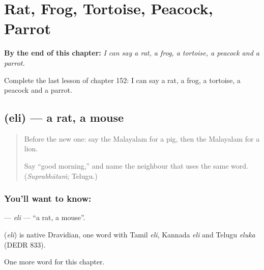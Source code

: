 
\chapter{Rat, Frog, Tortoise, Peacock, Parrot}
\label{ch:ml-rat-frog-tortoise-peacock-parrot}

\begin{chapteropening}
\textbf{By the end of this chapter:} \emph{I can say a rat, a frog, a tortoise, a peacock and a parrot.}

Complete the last lesson of chapter 152: I can say a rat, a frog, a tortoise, a peacock and a parrot.
\end{chapteropening}

\section[\texorpdfstring{\ml{എലി} (eli)}{എലി (eli)}]{ (eli) — a rat, a mouse}

\label{lesson:ML-C152-eli}



\begin{quote}
Before the new one: say the Malayalam for a pig, then the Malayalam for a lion.

Say \textquotedblleft{}good morning,\textquotedblright{} and name the neighbour that uses the same word. (\emph{Suprabhātaṁ}; Telugu.)
\end{quote}

\subsection*{You'll want to know: }
\textbf{} — \emph{eli} — \textquotedblleft{}a rat, a mouse\textquotedblright{}.

\begin{cousinweb}
\textbf{} (\emph{eli}) is native Dravidian, one word with Tamil \emph{eli}, Kannada \emph{eli} and Telugu \emph{eluka} (DEDR 833).
\end{cousinweb}

\begin{grammarlens}[title={What you've built}]
One more word for this chapter.
\end{grammarlens}


